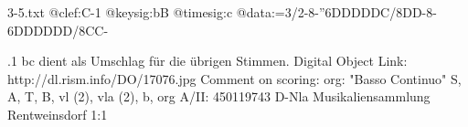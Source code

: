 \documentclass[twocolumn]{book}
\begin{document}
\begin{filecontents*}{3-5.txt}
@clef:C-1
@keysig:bB
@timesig:c
@data:=3/2-8-''6DDDDDC/8DD-8-6DDDDDD/8CC-
\end{filecontents*}
\immediate{}
%
.1
\newline bc dient als Umschlag für die übrigen Stimmen.
\newline Digital Object Link: http://dl.rism.info/DO/17076.jpg
\newline Comment on scoring: org: "Basso Continuo"
\newline S, A, T, B, vl (2), vla (2), b, org
\newline A/II: 450119743
\newline D-Nla Musikaliensammlung Rentweinsdorf 1:1
\newline 
\end{document}
